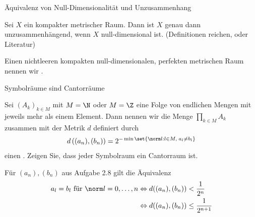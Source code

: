 \begin{uebung} Äquivalenz von Null-Dimensionalität und Unzusammenhang

Sei $X$ ein kompakter metrischer Raum. Dann ist $X$ genau dann unzusammenhängend, wenn $X$ null-dimensional ist. (Definitionen reichen, oder Literatur)
\end{uebung}
\begin{definition}
Einen nichtleeren kompakten null-dimensionalen, perfekten metrischen Raum nennen wir .
\end{definition}
\begin{uebung} Symbolräume sind Cantorräume

Sei $(A_k)_{k \in M}$ mit $M = \N$ oder $M = \Z$ eine Folge von endlichen Mengen mit jeweils mehr als einem Element. Dann nennen wir die Menge $\prod_{k \in M} A_k$ zusammen mit der Metrik $d$ definiert durch 
\begin{align*}
  d\left((a_n), (b_n)\right) = 2^{- \min\set{\norm l: l \in M, \; a_l \neq b_l}}
\end{align*}
 einen . Zeigen Sie, dass jeder Symbolraum ein Cantorraum ist. 
\end{uebung}
\begin{bemerkung}
  Für $(a_n), (b_n)$ aus Aufgabe 2.8 gilt die Äquivalenz
  \begin{align*}
    a_l = b_l \text{ für } \norm l = 0, \dots, n &\Leftrightarrow d((a_n), (b_n)) < \frac 1 {2^n}\\
&\Leftrightarrow d((a_n), (b_n)) \leq \frac 1 {2^{n+1}}
  \end{align*}
\end{bemerkung}
